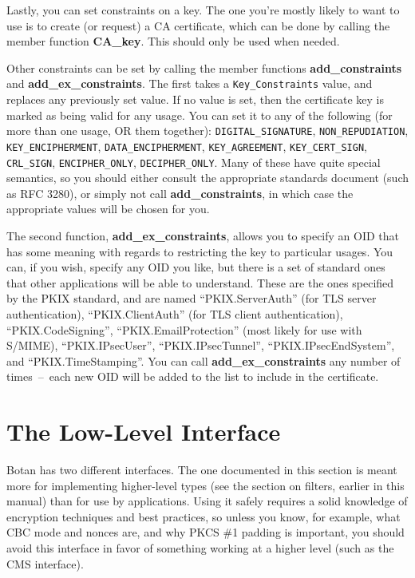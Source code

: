 \documentclass{article}
\newcommand{\function}[1]{\textbf{#1}}
\newcommand{\type}[1]{\texttt{#1}}
\begin{document}
Lastly, you can set constraints on a key. The one you're mostly likely to want
to use is to create (or request) a CA certificate, which can be done by calling
the member function \function{CA\_key}. This should only be used when needed.

Other constraints can be set by calling the member functions
\function{add\_constraints} and \function{add\_ex\_constraints}. The first
takes a \type{Key\_Constraints} value, and replaces any previously set
value. If no value is set, then the certificate key is marked as being valid
for any usage.  You can set it to any of the following (for more than one
usage, OR them together): \type{DIGITAL\_SIGNATURE}, \type{NON\_REPUDIATION},
\type{KEY\_ENCIPHERMENT}, \type{DATA\_ENCIPHERMENT}, \type{KEY\_AGREEMENT},
\type{KEY\_CERT\_SIGN}, \type{CRL\_SIGN}, \type{ENCIPHER\_ONLY},
\type{DECIPHER\_ONLY}. Many of these have quite special semantics, so you
should either consult the appropriate standards document (such as RFC 3280), or
simply not call \function{add\_constraints}, in which case the appropriate
values will be chosen for you.

The second function, \function{add\_ex\_constraints}, allows you to specify an
OID that has some meaning with regards to restricting the key to particular
usages. You can, if you wish, specify any OID you like, but there is a set of
standard ones that other applications will be able to understand. These are
the ones specified by the PKIX standard, and are named ``PKIX.ServerAuth'' (for
TLS server authentication), ``PKIX.ClientAuth'' (for TLS client
authentication), ``PKIX.CodeSigning'', ``PKIX.EmailProtection'' (most likely
for use with S/MIME), ``PKIX.IPsecUser'', ``PKIX.IPsecTunnel'',
``PKIX.IPsecEndSystem'', and ``PKIX.TimeStamping''. You can call
\function{add\_ex\_constraints} any number of times~--~each new OID will be
added to the list to include in the certificate.

\pagebreak
\section{The Low-Level Interface}

Botan has two different interfaces. The one documented in this section is meant
more for implementing higher-level types (see the section on filters, earlier in
this manual) than for use by applications. Using it safely requires a solid
knowledge of encryption techniques and best practices, so unless you know, for
example, what CBC mode and nonces are, and why PKCS \#1 padding is important,
you should avoid this interface in favor of something working at a higher level
(such as the CMS interface).
\end{document}
